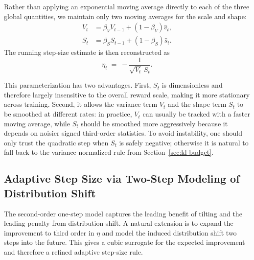 \documentclass[11pt]{article}
\theoremstyle{definition}
\theoremstyle{remark}
\begin{document}
Rather than applying an exponential moving average directly to each of the three global quantities, we maintain only two moving averages for the scale and shape:
\begin{align}
  V_t &= \beta_V V_{t-1} + (1-\beta_V)\hat v_t, \\
  S_t &= \beta_S S_{t-1} + (1-\beta_S)\hat s_t.
\end{align}
The running step-size estimate is then reconstructed as
\begin{equation}
  \eta_t
  \;=\;
  -\frac{1}{\sqrt{V_t}\,S_t}.
\end{equation}

This parameterization has two advantages. First, $S_t$ is dimensionless and therefore largely insensitive to the overall reward scale, making it more stationary across training. Second, it allows the variance term $V_t$ and the shape term $S_t$ to be smoothed at different rates: in practice, $V_t$ can usually be tracked with a faster moving average, while $S_t$ should be smoothed more aggressively because it depends on noisier signed third-order statistics. To avoid instability, one should only trust the quadratic step when $S_t$ is safely negative; otherwise it is natural to fall back to the variance-normalized rule from Section~\ref{sec:kl-budget}.

\subsection{Adaptive Step Size via Two-Step Modeling of Distribution Shift}
\label{sec:optimal-eta-third-order}

The second-order one-step model captures the leading benefit of tilting and the leading penalty from distribution shift. A natural extension is to expand the improvement to third order in $\eta$ and model the induced distribution shift two steps into the future. This gives a cubic surrogate for the expected improvement and therefore a refined adaptive step-size rule.
\end{document}

